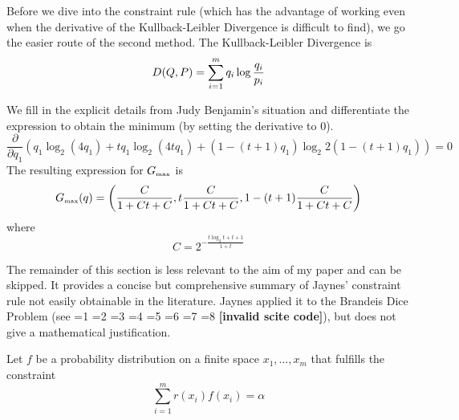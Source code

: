 \documentclass[12pt]{article}
\newif\ifNumericalOrYear
\newcommand{\PageP}{p.~}
\newcommand{\PageP}{}
\newcommand{\scite}[3]{\ifnum#1=1\ifNumericalOrYear\citep{#2}\else\citeyearpar{#2}\fi\else
\ifnum#1=2\ifNumericalOrYear\citep[#3]{#2}\else\citep[{\PageP}#3]{#2}\fi\else
\ifnum#1=3\ifNumericalOrYear(\citet[#3]{#2})\else\citep[{\PageP}#3]{#2}\fi\else
\ifnum#1=4\ifNumericalOrYear\citet{#2}\else\citet{#2}\fi\else
\ifnum#1=5\ifNumericalOrYear(\citet{#2})\else\citep{#2}\fi\else
\ifnum#1=6\ifNumericalOrYear(\citet[#3]{#2})\else\citep[{\PageP}#3]{#2}\fi\else
\ifnum#1=7\ifNumericalOrYear\citep{#2}\else\citealp{#2}\fi\else
\ifnum#1=8\ifNumericalOrYear\citep[#3]{#2}\else\citealp[{\PageP}#3]{#2}\fi\else
\textbf{[invalid scite code]}\fi\fi\fi\fi\fi\fi\fi\fi}
\begin{document}


Before we dive into the constraint rule (which has the advantage of
working even when the derivative of the Kullback-Leibler Divergence is
difficult to find), we go the easier route of the second method. The
Kullback-Leibler Divergence is
\begin{equation}
  D(Q,P)=\sum_{i=1}^{m}q_{i}\log\frac{q_{i}}{p_{i}}\notag
\end{equation}

We fill in the explicit details from Judy Benjamin's situation and
differentiate the expression to obtain the minimum (by setting the
derivative to $0$). 
\begin{displaymath}
\frac{\partial}{\partial{}q_{1}}(q_{1}\log_{2}(4q_{1})+tq_{1}\log_{2}(4tq_{1})+(1-(t+1)q_{1})\log_{2}2(1-(t+1)q_{1}))=0
\end{displaymath}
The resulting expression for $G_{\mbox{\tiny max}}$ is
\begin{displaymath}
  G_{\mbox{\tiny max}}(q)=\left(\frac{C}{1+Ct+C},t\frac{C}{1+Ct+C},1-(t+1)\frac{C}{1+Ct+C}\right)
\end{displaymath}
where
\begin{displaymath}
  C=2^{-\frac{t\log_{2}t+t+1}{1+t}}
\end{displaymath}

The remainder of this section is less relevant to the aim of my paper
and can be skipped. It provides a concise but comprehensive summary of
Jaynes' constraint rule not easily obtainable in the literature.
Jaynes applied it to the Brandeis Dice Problem (see
\scite{8}{jaynes89}{243}), but does not give a mathematical
justification.

Let $f$ be a probability distribution on a finite space
$x_{1},\ldots,x_{m}$ that fulfills the constraint 
\begin{equation}
  \label{eq:constraint}
\sum_{i=1}^{m}r(x_{i})f(x_{i})=\alpha
\end{equation}
\end{document}
